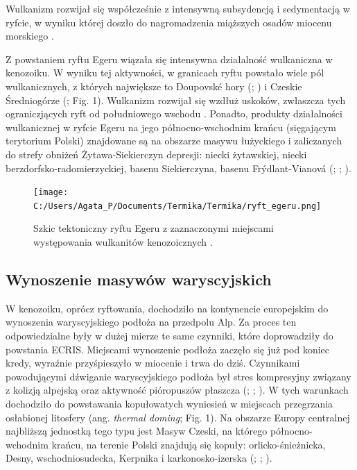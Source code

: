 \documentclass[11.5pt,twoside]{report}
\begin{document}
 Wulkanizm rozwijał się współcześnie z intensywną subsydencją i sedymentacją w ryfcie, w wyniku której doszło do nagromadzenia miąższych osadów miocenu morskiego \parencite{Grygar.2016}.

Z powstaniem ryftu Egeru wiązała się intensywna działalność wulkaniczna w kenozoiku. W wyniku tej aktywności, w granicach ryftu powstało wiele pól wulkanicznych, z których największe to Doupovsk\'{e} hory (\cite{Haloda.2012}; \cite{Skacelova.2009}) i Czeskie Średniogórze (\cite{Cajz.2009}; Fig. 1). Wulkanizm rozwijał się wzdłuż uskoków, zwłaszcza tych ograniczjących ryft od południowego wschodu \parencite{Grygar.2016}. Ponadto, produkty działalności wulkanicznej w ryfcie Egeru na jego północno-wschodnim krańcu (sięgającym terytorium Polski) znajdowane są na obszarze masywu łużyckiego i zaliczanych do strefy obniżeń Żytawa-Siekierczyn depresji: niecki żytawskiej, niecki berzdorfsko-radomierzyckiej, basenu Siekierczyna, basenu Fr\'{y}dlant-Vianov\'{a} (\cite{Woloszyn.2017}; \cite{Cajz.2009}; \cite{Piatkowska.2000}). 


\begin{figure}[h]
	\centering
	\texttt{[image: C:/Users/Agata\_P/Documents/Termika/Termika/ryft\_egeru.png]}
	\caption{Szkic tektoniczny ryftu Egeru z zaznaczonymi miejscami występowania wulkanitów kenozoicznych \parencite{Cajz.2009}.}
	\label{Fig.}
\end{figure}


	\subsection{Wynoszenie masywów waryscyjskich}
	
W kenozoiku, oprócz ryftowania, dochodziło na kontynencie europejskim do wynoszenia waryscyjskiego podłoża na przedpolu Alp. Za proces ten odpowiedzialne były w dużej mierze te same czynniki, które doprowadziły do powstania ECRIS. Miejscami wynoszenie podłoża zaczęło się już pod koniec kredy, wyra\'{z}nie przyśpieszyło w miocenie i trwa do dziś. Czynnikami powodującymi d\'{z}wiganie waryscyjskiego podłoża był stres kompresyjny związany z kolizją alpejską oraz aktywność pióropuszów płaszcza (\cite{Ziegler.2007}; \cite{Wilson.2006}; \cite{Wilson.2001}). W tych warunkach dochodziło do powstawania kopułowatych wyniesień w miejscach przegrzania osłabionej litosfery (ang. \textit{thermal doming}; Fig. 1). Na obszarze Europy centralnej najbliższą jednostką tego typu jest Masyw Czeski, na którego północno-wchodnim krańcu, na terenie Polski znajdują się kopuły: orlicko-śnieżnicka, Desny, wschodniosudecka, Kerpnika i karkonosko-izerska (\cite{Cymerman.2016}; \cite{Mazur.2001}; \cite{Maluski.1995}). 
\end{document}
